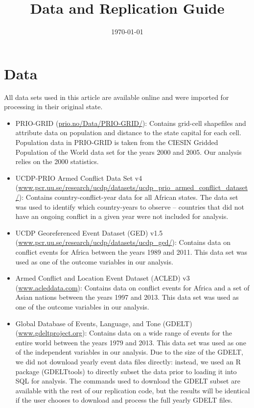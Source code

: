 \documentclass[hidelinks]{article}
\begin{document}
\title{Data and Replication Guide}
\date{\today}
\maketitle
\vfill
\pagebreak

\section{Data}
All data sets used in this article are available online and were imported for processing in their original state.

\begin{itemize}
\item PRIO-GRID (\url{prio.no/Data/PRIO-GRID/}): Contains grid-cell shapefiles and attribute data on population and distance to the state capital for each cell. Population data in PRIO-GRID is taken from the CIESIN Gridded Population of the World data set for the years 2000 and 2005. Our analysis relies on the 2000 statistics.

\item UCDP-PRIO Armed Conflict Data Set v4 (\url{www.pcr.uu.se/research/ucdp/datasets/ucdp_prio_armed_conflict_dataset/}): Contains country-conflict-year data for all African states. The data set was used to identify which country-years to observe -- countries that did not have an ongoing conflict in a given year were not included for analysis.

\item UCDP Georeferenced Event Dataset (GED) v1.5 (\url{www.pcr.uu.se/research/ucdp/datasets/ucdp_ged/}): Contains data on conflict events for Africa between the years 1989 and 2011. This data set was used as one of the outcome variables in our analysis.

\item Armed Conflict and Location Event Dataset (ACLED) v3 (\url{www.acleddata.com}): Contains data on conflict events for Africa and a set of Asian nations between the years 1997 and 2013. This data set was used as one of the outcome variables in our analysis.

\item Global Database of Events, Language, and Tone (GDELT) (\url{www.gdeltproject.org}): Contains data on a wide range of events for the entire world between the years 1979 and 2013. This data set was used as one of the independent variables in our analysis. Due to the size of the GDELT, we did not download yearly event data files directly: instead, we used an R package (GDELTtools) to directly subset the data prior to loading it into SQL for analysis. The commands used to download the GDELT subset are available with the rest of our replication code, but the results will be identical if the user chooses to download and process the full yearly GDELT files.
\end{itemize}
\end{document}
